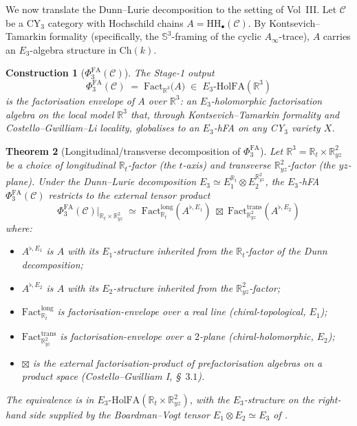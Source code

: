 \documentclass[11pt]{article}
\newtheorem{theorem}{Theorem}[section]
\newtheorem{construction}[theorem]{Construction}
\newcommand{\Eone}{E_{1}}
\newcommand{\Etwo}{E_{2}}
\newcommand{\Ethree}{E_{3}}
\newcommand{\R}{\mathbb{R}}
\newcommand{\HH}{\mathrm{HH}}
\newcommand{\PhiFA}{\Phi^{\mathrm{FA}}}
\newcommand{\HolFA}{\mathrm{HolFA}}
\newcommand{\cC}{\mathcal{C}}
\begin{document}
We now translate the Dunn--Lurie decomposition to the setting of Vol~III.
Let $\cC$ be a CY$_{3}$ category with Hochschild chains
$A = \HH_{\bullet}(\cC)$. By Kontsevich--Tamarkin formality
(specifically, the $\mathbb{S}^{3}$-framing of the cyclic $A_{\infty}$-trace),
$A$ carries an $\Ethree$-algebra structure in $\mathrm{Ch}(k)$.

\begin{construction}[$\PhiFA_{3}(\cC)$]
\label{constr:phifa3}
The Stage-1 output
\[
  \PhiFA_{3}(\cC) \;=\; \mathrm{Fact}_{\R^{3}}\bigl(A\bigr)
  \;\in\; E_{3}\text{-}\HolFA(\R^{3})
\]
is the factorisation envelope of $A$ over $\R^{3}$: an
$E_{3}$-holomorphic factorisation algebra on the local model $\R^{3}$
that, through Kontsevich--Tamarkin formality and
Costello--Gwilliam--Li locality, globalises to an $E_{3}$-hFA on any
CY$_{3}$ variety $X$.
\end{construction}

\begin{theorem}[Longitudinal/transverse decomposition of $\PhiFA_{3}$]
\label{thm:phifa3-longitudinal-transverse}
Let $\R^{3} = \R_{t} \times \R^{2}_{yz}$ be a choice of longitudinal
$\R_{t}$-factor (the $t$-axis) and transverse $\R^{2}_{yz}$-factor
(the $yz$-plane). Under the Dunn--Lurie decomposition
$E_{3} \simeq E_{1}^{\R_{t}} \otimes E_{2}^{\R^{2}_{yz}}$, the
$E_{3}$-hFA $\PhiFA_{3}(\cC)$ restricts to the external tensor product
\[
  \PhiFA_{3}(\cC)\big|_{\R_{t} \times \R^{2}_{yz}}
  \;\simeq\;
  \mathrm{Fact}^{\mathrm{long}}_{\R_{t}}(A^{\flat, \Eone})
  \;\boxtimes\;
  \mathrm{Fact}^{\mathrm{trans}}_{\R^{2}_{yz}}(A^{\flat, \Etwo})
\]
where:
\begin{itemize}[leftmargin=*]
  \item $A^{\flat, \Eone}$ is $A$ with its $\Eone$-structure inherited
    from the $\R_{t}$-factor of the Dunn decomposition;
  \item $A^{\flat, \Etwo}$ is $A$ with its $\Etwo$-structure inherited
    from the $\R^{2}_{yz}$-factor;
  \item $\mathrm{Fact}^{\mathrm{long}}_{\R_{t}}$ is factorisation-envelope
    over a real line (chiral-topological, $E_{1}$);
  \item $\mathrm{Fact}^{\mathrm{trans}}_{\R^{2}_{yz}}$ is
    factorisation-envelope over a $2$-plane (chiral-holomorphic,
    $E_{2}$);
  \item $\boxtimes$ is the external factorisation-product of prefactorisation
    algebras on a product space (Costello--Gwilliam I, \S~$3.1$).
\end{itemize}
The equivalence is in $E_{3}\text{-}\HolFA(\R_{t} \times \R^{2}_{yz})$,
with the $E_{3}$-structure on the right-hand side supplied by the
Boardman--Vogt tensor $E_{1} \otimes E_{2} \simeq E_{3}$ of
.
\end{theorem}
\end{document}

